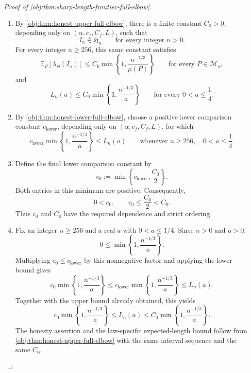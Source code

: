 \documentclass[11pt]{article}
\begin{document}
\begin{proof}[Proof of \cref{obj:thm:sharp-length-frontier-full-elbow}]
\begin{enumerate}
\item By \cref{obj:thm:honest-upper-full-elbow}, there is a finite constant \(C_0>0\), depending only on \((\alpha,c_f,C_f,L)\), such that
\[
I_n\in\mathfrak H_n
\qquad\text{for every integer }n>0.
\]
For every integer \(n\ge256\), this same constant satisfies
\[
\mathbb E_P\!\left[\lambda_{\Theta}(I_n)\right]
\le C_0\min\left\{1,\frac{n^{-1/3}}{\mu(P)}\right\}
\qquad\text{for every }P\in\mathcal M_n,
\]
and
\[
L_n(a)\le C_0\min\left\{1,\frac{n^{-1/3}}{a}\right\}
\qquad\text{for every }0<a\le\frac14.
\]

\item By \cref{obj:thm:honest-lower-full-elbow}, choose a positive lower comparison constant \(c_{\mathrm{lower}}\), depending only on \((\alpha,c_f,C_f,L)\), for which
\[
c_{\mathrm{lower}}\min\left\{1,\frac{n^{-1/3}}{a}\right\}
\le L_n(a)
\qquad
\text{whenever }n\ge256,\quad 0<a\le\frac14.
\]

\item Define the final lower comparison constant by
\[
c_0:=\min\left\{c_{\mathrm{lower}},\frac{C_0}{2}\right\}.
\]
Both entries in this minimum are positive. Consequently,
\[
0<c_0,
\qquad
c_0\le\frac{C_0}{2}<C_0.
\]
Thus \(c_0\) and \(C_0\) have the required dependence and strict ordering.

\item Fix an integer \(n\ge256\) and a real \(a\) with \(0<a\le1/4\). Since \(n>0\) and \(a>0\),
\[
0\le\min\left\{1,\frac{n^{-1/3}}{a}\right\}.
\]
Multiplying \(c_0\le c_{\mathrm{lower}}\) by this nonnegative factor and applying the lower bound gives
\[
c_0\min\left\{1,\frac{n^{-1/3}}{a}\right\}
\le
c_{\mathrm{lower}}\min\left\{1,\frac{n^{-1/3}}{a}\right\}
\le L_n(a).
\]
Together with the upper bound already obtained, this yields
\[
c_0\min\left\{1,\frac{n^{-1/3}}{a}\right\}
\le L_n(a)
\le C_0\min\left\{1,\frac{n^{-1/3}}{a}\right\}.
\]
The honesty assertion and the law-specific expected-length bound follow from \cref{obj:thm:honest-upper-full-elbow} with the same interval sequence and the same \(C_0\).
\end{enumerate}
\end{proof}
\end{document}
